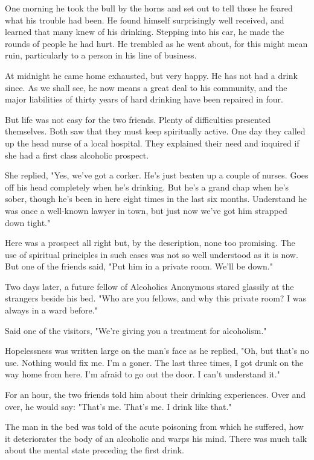 \begin{biblechapter}
One morning he took the bull by the horns and set out to tell those he feared what his trouble had been.  He found himself surprisingly well received, and learned that many knew of his drinking.  Stepping into his car, he made the rounds of people he had hurt.  He trembled as he went about, for this might mean ruin, particularly to a person in his line of business.

At midnight he came home exhausted, but very happy.  He has not had a drink since.  As we shall see, he now means a great deal to his community, and the major liabilities of thirty years of hard drinking have been repaired in four.


But life was not easy for the two friends.  Plenty of difficulties presented themselves.  Both saw that they must keep spiritually active.  One day they called up the head nurse of a local hospital.  They explained their need and inquired if she had a first class alcoholic prospect.

She replied, "Yes, we've got a corker.  He's just beaten up a couple of nurses.  Goes off his head completely when he's drinking.  But he's a grand chap when he's sober, though he's been in here eight times in the last six months.  Understand he was once a well-known lawyer in town, but just now we've got him strapped down tight." 

Here was a prospect all right but, by the description, none too promising.  The use of spiritual principles in such cases was not so well understood as it is now.  But one of the friends said, "Put him in a private room.  We'll be down."

Two days later, a future fellow of Alcoholics Anonymous stared glassily at the strangers beside his bed.  "Who are you fellows, and why this private room?  I was always in a ward before."

Said one of the visitors, "We're giving you a treatment for alcoholism."

Hopelessness was written large on the man's face as he replied, "Oh, but that's no use.  Nothing would fix me.  I'm a goner.  The last three times, I got drunk on the way home from here.  I'm afraid to go out the door.  I can't understand it."

For an hour, the two friends told him about their drinking experiences.  Over and over, he would say: "That's me.  That's me.  I drink like that."

The man in the bed was told of the acute poisoning from which he suffered, how it deteriorates the body of an alcoholic and warps his mind.  There was much talk about the mental state preceding the first drink.


\end{biblechapter}
